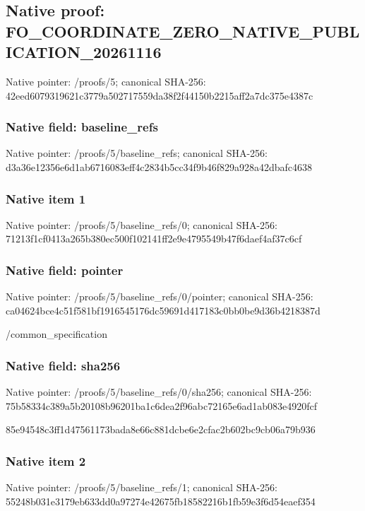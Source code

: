 \documentclass[10pt,a4paper]{article}
\begin{document}
\subsection{Native proof: FO\_\allowbreak{}COORDINATE\_\allowbreak{}ZERO\_\allowbreak{}NATIVE\_\allowbreak{}PUBLICATION\_\allowbreak{}20261116}
Native pointer: /proofs/5; canonical SHA-256: 42eed6079319621c3779a502717559da38f2f44150b2215aff2a7dc375e4387c

\subsubsection{Native field: baseline\_\allowbreak{}refs}
Native pointer: /proofs/5/baseline\_\allowbreak{}refs; canonical SHA-256: d3a36e12356e6d1ab6716083eff4c2834b5cc34f9b46f829a928a42dbafc4638

\subsubsection{Native item 1}
Native pointer: /proofs/5/baseline\_\allowbreak{}refs/0; canonical SHA-256: 71213f1cf0413a265b380ec500f102141ff2e9e4795549b47f6daef4af37c6cf

\subsubsection{Native field: pointer}
Native pointer: /proofs/5/baseline\_\allowbreak{}refs/0/pointer; canonical SHA-256: ca04624bce4c51f581bf1916545176dc59691d417183c0bb0be9d36b4218387d

\begingroup\raggedright\sloppy /\allowbreak{}common\_\allowbreak{}specification\par\endgroup

\subsubsection{Native field: sha256}
Native pointer: /proofs/5/baseline\_\allowbreak{}refs/0/sha256; canonical SHA-256: 75b58334c389a5b20108b96201ba1c6dea2f96abc72165e6ad1ab083e4920fcf

\begingroup\raggedright\sloppy 85e94548c3ff1d47561173bada8e66c881dcbe6e2cfac2b602bc9cb06a79b936\par\endgroup

\subsubsection{Native item 2}
Native pointer: /proofs/5/baseline\_\allowbreak{}refs/1; canonical SHA-256: 55248b031e3179eb633dd0a97274e42675fb18582216b1fb59e3f6d54eaef354
\end{document}
